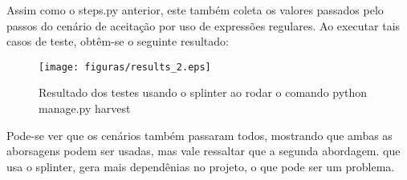     Assim como o steps.py anterior, este também coleta os valores passados pelo
    passos do cenário de aceitação por uso de expressões regulares. Ao executar
    tais casos de teste, obtêm-se o seguinte resultado:

      \begin{figure}[h!]
        \centering
        \texttt{[image: figuras/results\_2.eps]}
        \caption{Resultado dos testes usando o splinter ao rodar o comando
        python manage.py harvest}
    \end{figure}

    Pode-se ver que os cenários também passaram todos, mostrando que ambas as
    aborsagens podem ser usadas, mas vale ressaltar que a segunda abordagem. que
    usa o splinter, gera mais dependênias no projeto, o que pode ser um
    problema.

